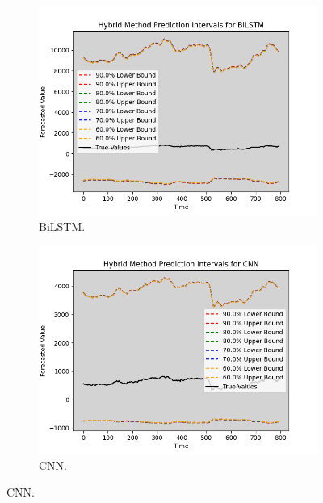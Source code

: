 \begin{figure}[H]
    \centering
    \begin{minipage}{0.45\textwidth}
        \centering
        \begin{subfigure}[b]{\textwidth}
            \centering
            \includegraphics[width=\textwidth]{Chap03/figs/BiLSTM_hybrid_method_plot_AxisBank_Method2.png}
            \caption{BiLSTM.}
        \end{subfigure}
        \hfill
        \begin{subfigure}[b]{\textwidth}
            \centering
            \includegraphics[width=\textwidth]{Chap03/figs/CNN_hybrid_method_plot_AxisBank_Method2.png}
            \caption{CNN.}
        \end{subfigure}

\end{minipage}
\end{figure}
